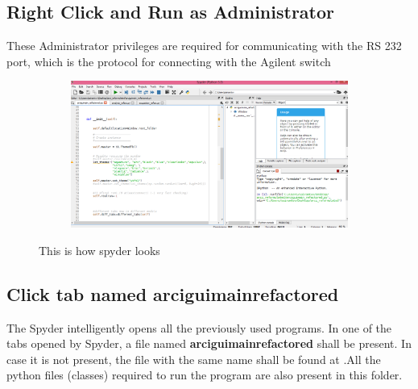 \documentclass[12pt]{article}
\begin{document}
\subsection{Right Click and Run as Administrator }
These Administrator privileges are required for communicating with the RS 232 port, which is the protocol for connecting with the Agilent switch

\begin{figure}[H]
 
    \begin{subfigure}{1\textwidth}
    \includegraphics[scale=0.3]{images/spyder_console.png} 
    \label{fig:DJp1}
    \end{subfigure}
 \caption{This is how spyder looks}
\label{fig6}
\end{figure}



\subsection{Click tab named \textbf{arciguimainrefactored}}
 The Spyder intelligently opens all the previously used programs. In one of the tabs opened by Spyder, a file named \textbf{arciguimainrefactored} shall be present. In case it is not present, the file with the same name shall be found at .All the python files (classes) required to run the program are also present in this folder.
 
\end{document}

